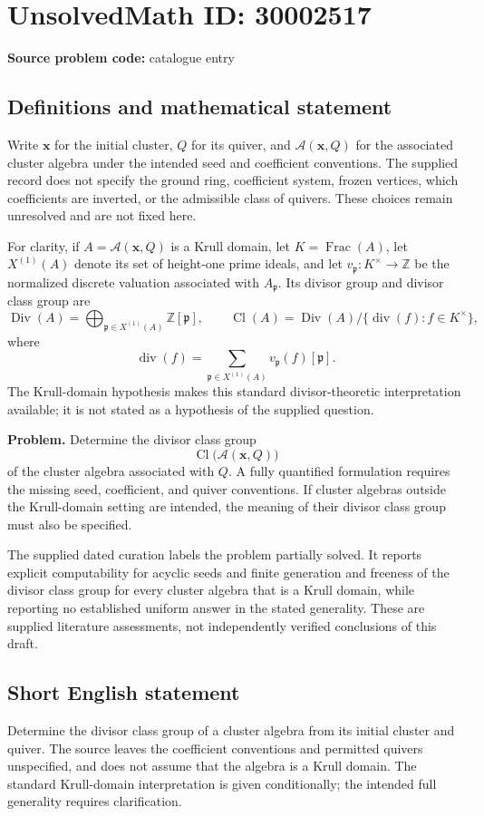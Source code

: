\documentclass[11pt]{article}
\newcommand{\Z}{\mathbb{Z}}
\begin{document}
\section*{UnsolvedMath ID: 30002517}
\textbf{Source problem code:} catalogue entry
\subsection{Definitions and mathematical statement}
Write \(\mathbf x\) for the initial cluster, \(Q\) for its quiver, and \(\mathcal A(\mathbf x,Q)\) for the associated cluster algebra under the intended seed and coefficient conventions. The supplied record does not specify the ground ring, coefficient system, frozen vertices, which coefficients are inverted, or the admissible class of quivers. These choices remain unresolved and are not fixed here.

For clarity, if \(A=\mathcal A(\mathbf x,Q)\) is a Krull domain, let \(K=\operatorname{Frac}(A)\), let \(X^{(1)}(A)\) denote its set of height-one prime ideals, and let \(v_{\mathfrak p}:K^\times\to\Z\) be the normalized discrete valuation associated with \(A_{\mathfrak p}\). Its divisor group and divisor class group are
\[
\operatorname{Div}(A)=\bigoplus_{\mathfrak p\in X^{(1)}(A)}\Z[\mathfrak p],\qquad
\operatorname{Cl}(A)=\operatorname{Div}(A)\big/\{\operatorname{div}(f):f\in K^\times\},
\]
where
\[
\operatorname{div}(f)=\sum_{\mathfrak p\in X^{(1)}(A)}v_{\mathfrak p}(f)[\mathfrak p].
\]
The Krull-domain hypothesis makes this standard divisor-theoretic interpretation available; it is not stated as a hypothesis of the supplied question.

\textbf{Problem.} Determine the divisor class group
\[
\operatorname{Cl}\bigl(\mathcal A(\mathbf x,Q)\bigr)
\]
of the cluster algebra associated with \(Q\). A fully quantified formulation requires the missing seed, coefficient, and quiver conventions. If cluster algebras outside the Krull-domain setting are intended, the meaning of their divisor class group must also be specified.

The supplied dated curation labels the problem partially solved. It reports explicit computability for acyclic seeds and finite generation and freeness of the divisor class group for every cluster algebra that is a Krull domain, while reporting no established uniform answer in the stated generality. These are supplied literature assessments, not independently verified conclusions of this draft.
\subsection{Short English statement}
Determine the divisor class group of a cluster algebra from its initial cluster and quiver. The source leaves the coefficient conventions and permitted quivers unspecified, and does not assume that the algebra is a Krull domain. The standard Krull-domain interpretation is given conditionally; the intended full generality requires clarification.
\end{document}
